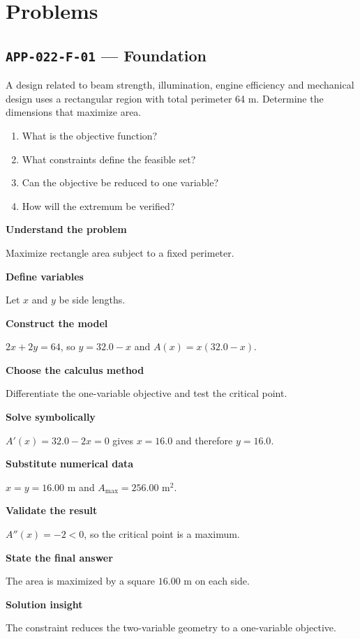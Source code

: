\documentclass[11pt]{book}
\newcommand{\pid}[1]{\texttt{#1}}
\begin{document}
\section*{Problems}
\subsection*{\pid{APP-022-F-01} — Foundation}
\begin{problembox}
A design related to beam strength, illumination, engine efficiency and mechanical design uses a rectangular region with total perimeter 64 m. Determine the dimensions that maximize area.
\end{problembox}
\begin{promptbox}\begin{enumerate}
\item What is the objective function?
\item What constraints define the feasible set?
\item Can the objective be reduced to one variable?
\item How will the extremum be verified?
\end{enumerate}\end{promptbox}
\begin{solutionbox}
\textbf{Understand the problem}\par Maximize rectangle area subject to a fixed perimeter.\par\medskip
\textbf{Define variables}\par Let $x$ and $y$ be side lengths.\par\medskip
\textbf{Construct the model}\par $2x+2y=64$, so $y=32.0-x$ and $A(x)=x(32.0-x)$.\par\medskip
\textbf{Choose the calculus method}\par Differentiate the one-variable objective and test the critical point.\par\medskip
\textbf{Solve symbolically}\par $A'(x)=32.0-2x=0$ gives $x=16.0$ and therefore $y=16.0$.\par\medskip
\textbf{Substitute numerical data}\par $x=y=16.00$ m and $A_{\max}=256.00$ m$^2$.\par\medskip
\textbf{Validate the result}\par $A''(x)=-2<0$, so the critical point is a maximum.\par\medskip
\textbf{State the final answer}\par The area is maximized by a square $16.00$ m on each side.\par\medskip
\textbf{Solution insight}\par The constraint reduces the two-variable geometry to a one-variable objective.\par\medskip
\end{solutionbox}
\end{document}
